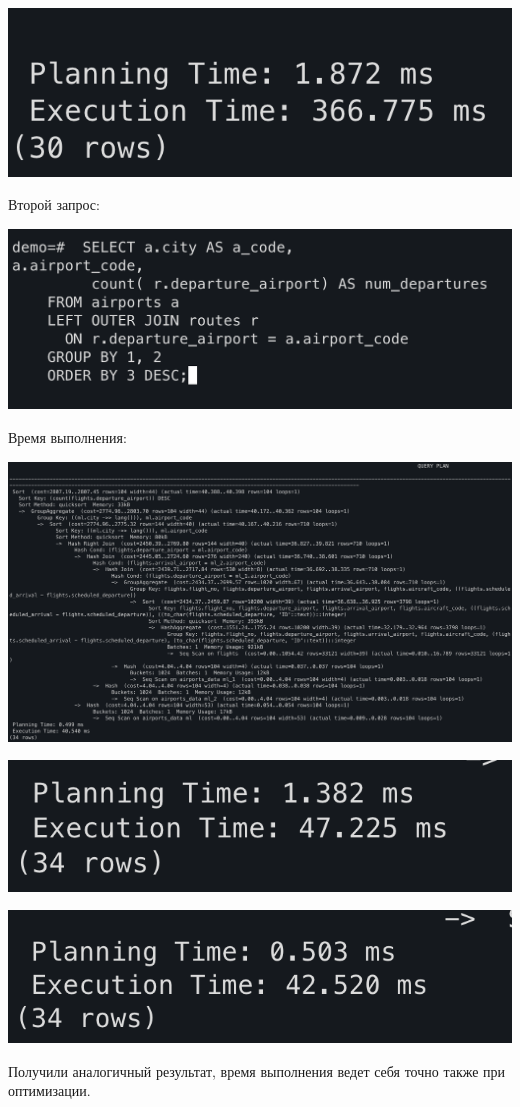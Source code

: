 \documentclass[a4paper,12pt]{article}
\begin{document}
\begin{center}
\includegraphics[scale=0.6]{89.png}
\end{center}
Второй запрос:
\begin{center}
\includegraphics[scale=0.6]{810.png}
\end{center}
Время выполнения:
\begin{center}
\includegraphics[scale=0.3]{811.png}
\end{center}
\begin{center}
\includegraphics[scale=0.6]{812.png}
\end{center}
\begin{center}
\includegraphics[scale=0.6]{813.png}
\end{center}
Получили аналогичный результат, время выполнения ведет себя точно также при оптимизации.
\end{document}
